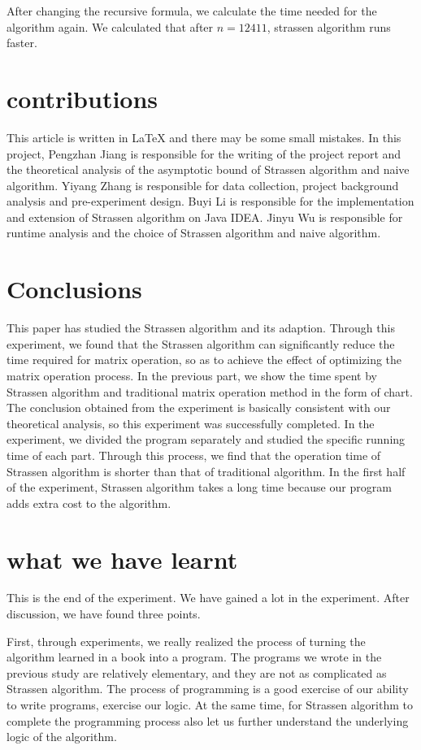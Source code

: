 \documentclass[journal]{IEEEtran}
\begin{document}
After changing the recursive formula, we calculate the time needed for the algorithm again. 
We calculated that after $n=12411$, strassen algorithm runs faster.

\section{contributions}
This article is written in LaTeX and there may be some small mistakes.
In this project, Pengzhan Jiang is responsible for the writing of the project report and the theoretical analysis of the asymptotic bound of Strassen algorithm and naive algorithm.
Yiyang Zhang is responsible for data collection, project background analysis and pre-experiment design.
Buyi Li is responsible for the implementation and extension of Strassen algorithm on Java IDEA.
Jinyu Wu is responsible for runtime analysis and the choice of Strassen algorithm and naive algorithm.

\section{Conclusions}


This paper has studied the Strassen algorithm and its adaption.
Through this experiment, we found that the Strassen algorithm can significantly reduce the time required for matrix operation, so as to achieve the effect of optimizing the matrix operation process.
In the previous part, we show the time spent by Strassen algorithm and traditional matrix operation method in the form of chart.
The conclusion obtained from the experiment is basically consistent with our theoretical analysis, so this experiment was successfully completed.
In the experiment, we divided the program separately and studied the specific running time of each part.
Through this process, we find that the operation time of Strassen algorithm is shorter than that of traditional algorithm.
In the first half of the experiment, Strassen algorithm takes a long time because our program adds extra cost to the algorithm.


\section{what we have learnt}
This is the end of the experiment.
We have gained a lot in the experiment.
After discussion, we have found three points.


First, through experiments, we really realized the process of turning the algorithm learned in a book into a program.
The programs we wrote in the previous study are relatively elementary, and they are not as complicated as Strassen algorithm.
The process of programming is a good exercise of our ability to write programs, exercise our logic.
At the same time, for Strassen algorithm to complete the programming process also let us further understand the underlying logic of the algorithm.
\end{document}
